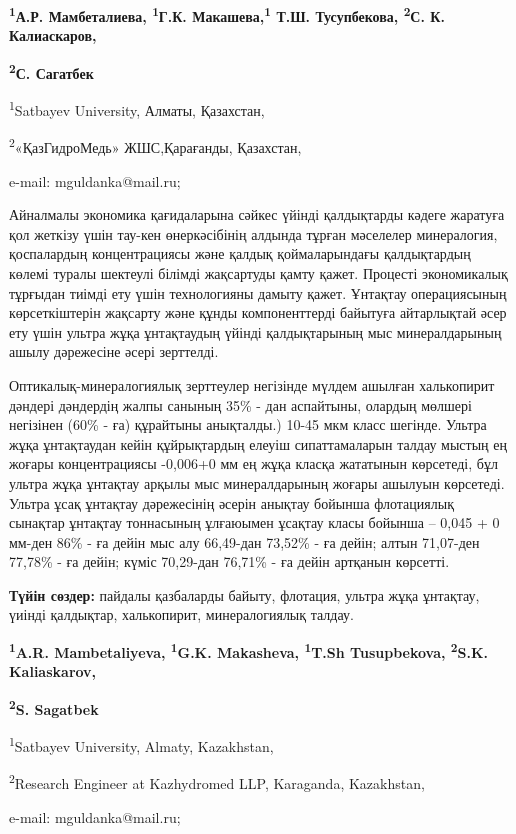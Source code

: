 
\begin{center}
{\bfseries \textsuperscript{1}А.Р. Мамбеталиева, \textsuperscript{1}Г.К.
Макашева\envelope,\textsuperscript{1} Т.Ш. Тусупбекова,
\textsuperscript{2}С. К. Калиаскаров,}

{\bfseries \textsuperscript{2}С. Сагатбек}

\textsuperscript{1}Satbayev University, Алматы, Қазахстан,

\textsuperscript{2}«ҚазГидроМедь» ЖШС,Қарағанды, Қазахстан,

e-mail: mguldanka@mail.ru;
\end{center}

Айналмалы экономика қағидаларына сәйкес үйінді қалдықтарды кәдеге
жаратуға қол жеткізу үшін тау-кен өнеркәсібінің алдында тұрған мәселелер
минералогия, қоспалардың концентрациясы және қалдық қоймаларындағы
қалдықтардың көлемі туралы шектеулі білімді жақсартуды қамту қажет.
Процесті экономикалық тұрғыдан тиімді ету үшін технологияны дамыту
қажет. Ұнтақтау операциясының көрсеткіштерін жақсарту және құнды
компоненттерді байытуға айтарлықтай әсер ету үшін ультра жұқа
ұнтақтаудың үйінді қалдықтарының мыс минералдарының ашылу дәрежесіне
әсері зерттелді.

Оптикалық-минералогиялық зерттеулер негізінде мүлдем ашылған халькопирит
дәндері дәндердің жалпы санының 35\% - дан аспайтыны, олардың мөлшері
негізінен (60\% - ға) құрайтыны анықталды.) 10-45 мкм класс шегінде.
Ультра жұқа ұнтақтаудан кейін құйрықтардың елеуіш сипаттамаларын талдау
мыстың ең жоғары концентрациясы -0,006+0 мм ең жұқа класқа жататынын
көрсетеді, бұл ультра жұқа ұнтақтау арқылы мыс минералдарының жоғары
ашылуын көрсетеді. Ультра ұсақ ұнтақтау дәрежесінің әсерін анықтау
бойынша флотациялық сынақтар ұнтақтау тоннасының ұлғаюымен ұсақтау класы
бойынша -- 0,045 + 0 мм-ден 86\% - ға дейін мыс алу 66,49-дан 73,52\% -
ға дейін; алтын 71,07-ден 77,78\% - ға дейін; күміс 70,29-дан 76,71\% -
ға дейін артқанын көрсетті.

{\bfseries Түйін сөздер:} пайдалы қазбаларды байыту, флотация, ультра жұқа
ұнтақтау, үиінді қалдықтар, халькопирит, минералогиялық талдау.


\begin{center}
{\bfseries \textsuperscript{1}A.R. Mambetaliyeva, \textsuperscript{1}G.K.
Makasheva\envelope, \textsuperscript{1}T.Sh Tusupbekova,
\textsuperscript{2}S.K. Kaliaskarov,}

{\bfseries \textsuperscript{2}S. Sagatbek}

\textsuperscript{1}Satbayev University, Almaty, Kazakhstan,

\textsuperscript{2}Research Engineer at Kazhydromed LLP, Karaganda,
Kazakhstan,

e-mail: mguldanka@mail.ru;
\end{center}

